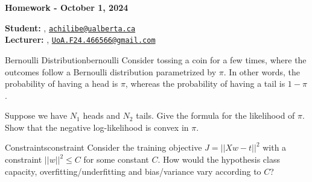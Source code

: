 





\begin{Large}
    \textsf{\textbf{Homework - October 1, 2024}}
\end{Large}

\vspace{1ex}

\textsf{\textbf{Student:}} , \href{mailto:achilibe@ualberta.ca}{\texttt{achilibe@ualberta.ca}}\\
\textsf{\textbf{Lecturer:}} , \href{mailto:UoA.F24.466566@gmail.com}{\texttt{UoA.F24.466566@gmail.com}}


\vspace{2ex}


\begin{problem}{Bernoulli Distribution}{bernoulli}
Consider tossing a coin for a few times, where the outcomes follow a Bernoulli distribution parametrized by $\pi$. In other words, the probability of having a head is $\pi$, whereas the probability of having a tail is $1-\pi$.

Suppose we have $N_1$ heads and $N_2$ tails. Give the formula for the likelihood of $\pi$. Show that the negative log-likelihood is convex in $\pi$.
\end{problem}



\begin{problem}{Constraints}{constraint}
  Consider the training objective $J=||Xw-t||^{2}$ with a constraint $||w||^{2}\leq C$ for some constant $C$. How would the hypothesis class capacity, overfitting/underfitting and bias/variance vary according to $C$?
\end{problem}









